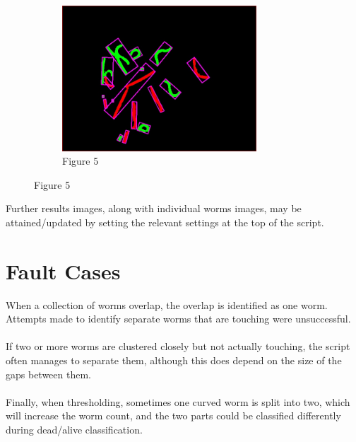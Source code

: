 \documentclass[a4paper,12pt]{article}
\begin{document}
\begin{figure}
    \centering
    \begin{subfigure}{0.8\textwidth}
        \centering
        \includegraphics[width=0.8\textwidth]{A01_step3.jpg}
        \captionsetup{labelformat=empty}
        \caption{Figure 5}
    \end{subfigure}
\end{figure}

\newpage
\noindent Further results images, along with individual worms images, may be attained/updated by setting the relevant settings at the top of the script.

\section*{Fault Cases}
When a collection of worms overlap, the overlap is identified as one worm. Attempts made to identify separate worms that are touching were unsuccessful.
\\\\
If two or more worms are clustered closely but not actually touching, the script often manages to separate them, although this does depend on the size of the gaps between them.
\\\\
Finally, when thresholding, sometimes one curved worm is split into two, which will increase the worm count, and the two parts could be classified differently during dead/alive classification.
\end{document}
